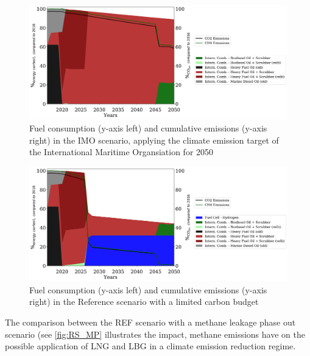 \documentclass[article]{elsarticle}
\begin{document}
\begin{figure}[htb]
    \centering
    \includegraphics[width=\textwidth]{figures/IMO_fuels_emissions.pdf}
    \caption{Fuel consumption (y-axis left) and cumulative emissions (y-axis right) in the IMO scenario, applying the climate emission target of the International Maritime Organsiation for 2050}
    \label{fig:IMO}
\end{figure}

\begin{figure}[htb]
    \centering
    \includegraphics[width=\textwidth]{figures/RS_fuels_emissions.pdf}
    \caption{Fuel consumption (y-axis left) and cumulative emissions (y-axis right) in the Reference scenario with a limited carbon budget}
    \label{fig:REF}
\end{figure}

The comparison between the REF scenario with a methane leakage phase out scenario (see \autoref{fig:RS_MP} illustrates the impact, methane emissions have on the possible application of LNG and LBG in a climate emission reduction regime.
\end{document}
